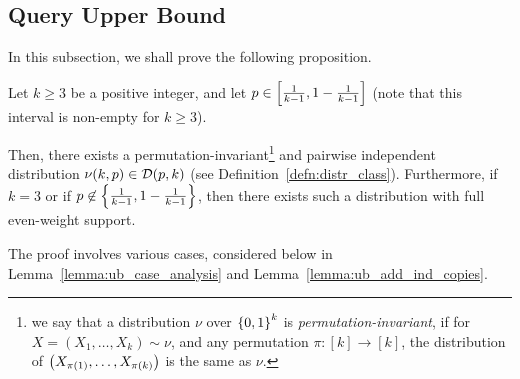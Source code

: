 \subsection{Query Upper Bound}

In this subsection, we shall prove the following proposition.
\begin{proposition}\label{prop:query_bias_ub}
	Let $k\geq 3$ be a positive integer, and let $p \in \left[ \frac{1}{k-1},1-\frac{1}{k-1} \right]$ (note that this interval is non-empty for $k\geq 3$).
	
	Then, there exists a permutation-invariant\footnote{we say that a distribution $\nu$ over $\left\{ 0,1 \right\}^k$ is \emph{permutation-invariant}, if for $X = (X_1,\dots,X_k)\sim \nu$, and any permutation $\pi:[k]\to [k]$, the distribution of $\left( X_{\pi(1)}, \dots, X_{\pi(k)} \right)$ is the same as $\nu$.} and pairwise independent distribution $\nu (k,p) \in \mathcal D(p,k)$ (see Definition~\ref{defn:distr_class}).
	Furthermore, if $k=3$ or if $p\not\in \left\{ \frac{1}{k-1}, 1-\frac{1}{k-1} \right\}$, then there exists such a distribution with full even-weight support.
\end{proposition}

The proof involves various cases, considered below in Lemma~\ref{lemma:ub_case_analysis} and Lemma~\ref{lemma:ub_add_ind_copies}.


